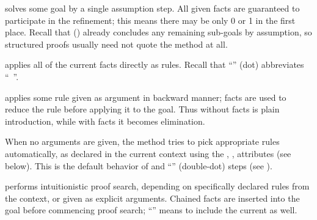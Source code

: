 \begin{isabellebody}
\begin{isamarkuptext}
\begin{descr}
  \item [\hyperlink{method.assumption}{\mbox{\isa{assumption}}}] solves some goal by a single assumption
  step.  All given facts are guaranteed to participate in the
  refinement; this means there may be only 0 or 1 in the first place.
  Recall that \hyperlink{command.qed}{\mbox{}} () already
  concludes any remaining sub-goals by assumption, so structured
  proofs usually need not quote the \hyperlink{method.assumption}{\mbox{}} method at
  all.
  
  \item [\hyperlink{method.this}{\mbox{\isa{this}}}] applies all of the current facts directly as
  rules.  Recall that ``\hyperlink{command.dot}{\mbox{\isa{\isacommand{{\isachardot}}}}}'' (dot) abbreviates ``\hyperlink{command.by}{\mbox{}}~''.
  
  \item [\hyperlink{method.rule}{\mbox{\isa{rule}}}~\isa{{\isachardoublequote}a\isactrlsub {\isadigit{1}}\ {\isasymdots}\ a\isactrlsub n{\isachardoublequote}}] applies some
  rule given as argument in backward manner; facts are used to reduce
  the rule before applying it to the goal.  Thus \hyperlink{method.rule}{\mbox{}}
  without facts is plain introduction, while with facts it becomes
  elimination.
  
  When no arguments are given, the \hyperlink{method.rule}{\mbox{}} method tries to pick
  appropriate rules automatically, as declared in the current context
  using the \hyperlink{attribute.Pure.intro}{\mbox{}}, \hyperlink{attribute.Pure.elim}{\mbox{}},
  \hyperlink{attribute.Pure.dest}{\mbox{}} attributes (see below).  This is the
  default behavior of \hyperlink{command.proof}{\mbox{}} and ``\hyperlink{command.ddot}{\mbox{\isa{\isacommand{{\isachardot}{\isachardot}}}}}'' 
  (double-dot) steps (see ).
  
  \item [\hyperlink{method.iprover}{\mbox{\isa{iprover}}}] performs intuitionistic proof search,
  depending on specifically declared rules from the context, or given
  as explicit arguments.  Chained facts are inserted into the goal
  before commencing proof search; ``\hyperlink{method.iprover}{\mbox{}}\isa{{\isachardoublequote}{\isacharbang}{\isachardoublequote}}'' 
  means to include the current \hyperlink{fact.prems}{\mbox{}} as well.
  

\end{descr}
\end{isamarkuptext}
\end{isabellebody}
